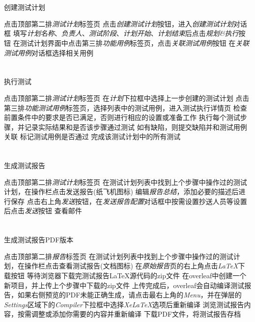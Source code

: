\documentclass[12pt,addpoints,fleqn]{exam}
\begin{document}
\begin{questions}
\begin{parts}
  \part{}创建测试计划
  \begin{subparts}
    \subpart{}点击顶部第二排\emph{测试计划}标签页
    \subpart{}点击\emph{创建测试计划}按钮，进入\emph{创建测试计划}对话框
    \subpart{}填写\emph{计划名称}、\emph{负责人}、\emph{测试阶段}、\emph{计划开始}、\emph{计划结束}后点击\emph{规划\&执行}按钮
    \subpart{}在测试计划界面中点击第三排\emph{功能用例}标签页，点击\emph{关联测试用例}按钮
    \subpart{}在\emph{关联测试用例}对话框选择相关用例
  \end{subparts}

  \part{}执行测试
  \begin{subparts}
    \subpart{}点击顶部第二排\emph{测试计划}标签页
    \subpart{}在\emph{计划}下拉框中选择上一步创建的测试计划
    \subpart{}点击第三排\emph{功能测试用例}标签页，选择列表中的测试用例，进入测试执行详情页
    \subpart{}检查前置条件中的要求是否已满足，否则进行相应的设置或准备工作
    \subpart{}执行每个测试步骤，并记录实际结果和是否该步骤通过测试
    \subpart{}如有缺陷，则提交缺陷并和测试用例关联
    \subpart{}标记测试用例是否通过
    \subpart{}完成该测试计划中的所有测试
  \end{subparts}

  \part{}生成测试报告
  \begin{subparts}
    \subpart{}点击顶部第二排\emph{测试计划}标签页
    \subpart{}在测试计划列表中找到上个步骤中操作过的测试计划，在操作栏点击发送报告(纸飞机图标)
    \subpart{}编辑\emph{报告总结}，添加必要的描述后进行保存
    \subpart{}点击右上角\emph{发送}按钮，在\emph{发送报告配置}对话框中按需设置抄送人员等设置后点击\emph{发送}按钮
    \subpart{}查看邮件
  \end{subparts}

  \part{}生成测试报告PDF版本
  \begin{subparts}
    \subpart{}点击顶部第二排\emph{报告}标签页
    \subpart{}在测试计划列表中找到上个步骤中操作过的测试计划，在操作栏点击查看测试报告(文档图标)
    \subpart{}在\emph{原始报告}页的右上角点击\emph{LaTeX}下载按钮
    \subpart{}等待浏览器下载完测试报告LaTeX源代码的zip文件
    \subpart{}在overleaf中创建一个新项目，并上传上个步骤中下载的zip文件
    \subpart{}上传完成后，overleaf会自动编译测试报告，如果右侧预览的PDF未能正确生成，请点击最右上角的\emph{Menu}，并在弹层的\emph{Settings}区域下的\emph{Compiler}下拉框中选择\emph{XeLaTeX}选项后重新编译
    \subpart{}浏览测试报告内容，按需调整或添加你需要的内容并重新编译
    \subpart{}下载PDF文件，将测试报告存档
  \end{subparts}


\end{parts}
\end{questions}
\end{document}
